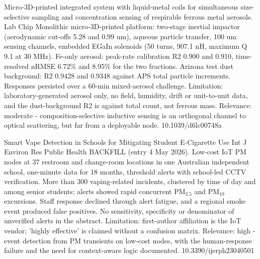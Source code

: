 \documentclass[10pt]{article}
\begin{document}
{Micro-3D-printed integrated system with liquid-metal coils for simultaneous size-selective sampling and concentration sensing of respirable ferrous metal aerosols.}
{Lab Chip}
{Monolithic micro-3D-printed platform: two-stage inertial impactor (aerodynamic cut-offs 5.28 and 0.99 um), aqueous particle transfer, 100 um sensing channels, embedded EGaIn solenoids (50 turns, 907.1 nH, maximum Q 9.1 at 30 MHz). Fe-only aerosol: peak-rate calibration R2 0.900 and 0.910, time-resolved nRMSE 6.72\% and 8.95\% for the two fractions. Arizona test dust background: R2 0.9428 and 0.9348 against APS total particle increments. Responses persisted over a 60-min mixed-aerosol challenge. Limitation: laboratory-generated aerosol only, no field, humidity, drift or unit-to-unit data, and the dust-background R2 is against total count, not ferrous mass. Relevance: moderate - composition-selective inductive sensing is an orthogonal channel to optical scattering, but far from a deployable node.}
{10.1039/d6lc00748a}

{Smart Vape Detection in Schools for Mitigating Student E-Cigarette Use}
{Int J Environ Res Public Health}
{BACKFILL (entry 4 May 2026). Low-cost IoT PM nodes at 37 restroom and change-room locations in one Australian independent school, one-minute data for 18 months, threshold alerts with school-led CCTV verification. More than 300 vaping-related incidents, clustered by time of day and among senior students; alerts showed rapid concurrent PM$_{2.5}$ and PM$_{10}$ excursions. Staff response declined through alert fatigue, and a regional smoke event produced false positives. No sensitivity, specificity or denominator of unverified alerts in the abstract. Limitation: first-author affiliation is the IoT vendor; 'highly effective' is claimed without a confusion matrix. Relevance: high - event detection from PM transients on low-cost nodes, with the human-response failure and the need for context-aware logic documented.}
{10.3390/ijerph23040501}

\par{}\baselineskip{}\baselineskip
{}
\end{document}
